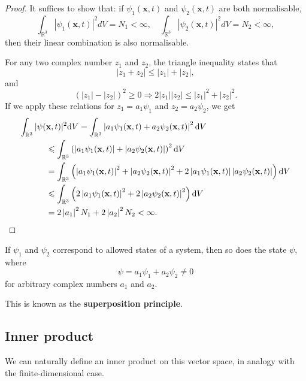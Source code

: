 \documentclass[a4paper,11pt]{article}
\begin{document}
\begin{proof}
    It suffices to show that: if $\psi_1(\mathbf{x}, t)$ and $\psi_2(\mathbf{x}, t)$ are both normalisable,
    \[
    \int_{\mathbb{R}^3}\left|\psi_1(\mathbf{x}, t)\right|^2 d V=N_1<\infty, \quad \int_{\mathbb{R}^3}\left|\psi_2(\mathbf{x}, t)\right|^2 d V=N_2<\infty,
    \]
    then their linear combination is also normalisable.

    For any two complex number $z_1$ and $z_2$, the triangle inequality states that
    \[
    \left|z_1+z_2\right| \leq\left|z_1\right|+\left|z_2\right|,
    \]
    and
    \[
    \left(\left|z_1\right|-\left|z_2\right|\right)^2 \geq 0 \Rightarrow 2\left|z_1\right|\left|z_2\right| \leq\left|z_1\right|^2+\left|z_2\right|^2 .
    \]
    If we apply these relations for $z_1=a_1 \psi_1$ and $z_2=a_2 \psi_2$, we get
    \begin{align*}
        \int_{\mathbb{R}^3}|\psi(&\mathbf{x}, t)|^2 \dd V =\int_{\mathbb{R}^3}\left|a_1 \psi_1(\mathbf{x}, t)+a_2 \psi_2(\mathbf{x}, t)\right|^2 \dd V \\
        & \leqslant \int_{\mathbb{R}^3}\left(\left|a_1 \psi_1(\mathbf{x}, t)\right|+\left|a_2 \psi_2(\mathbf{x}, t)\right|\right)^2 \dd V \\
        &=\int_{\mathbb{R}^3}\left(\left|a_1 \psi_1(\mathbf{x}, t)\right|^2+\left|a_2 \psi_2(\mathbf{x}, t)\right|^2+2\left|a_1 \psi_1(\mathbf{x}, t)\right|\left|a_2 \psi_2(\mathbf{x}, t)\right|\right) \dd V \\
        & \leqslant \int_{\mathbb{R}^3}\left(2\left|a_1 \psi_1(\mathbf{x}, t)\right|^2+2\left|a_2 \psi_2(\mathbf{x}, t)\right|^2\right) \dd V \\
        &=2\left|a_1\right|^2 N_1+2\left|a_2\right|^2 N_2<\infty .\qedhere
    \end{align*}
\end{proof}

\begin{corollary}
    If $\psi_1$ and $\psi_2$ correspond to allowed states of a system, then so does the state $\psi$, where
    \[
    \psi=a_1 \psi_1+a_2 \psi_2 \neq 0
    \]
    for arbitrary complex numbers $a_1$ and $a_2$. 
\end{corollary}
This is known as the \textbf{superposition principle}.

\subsection{Inner product}
We can naturally define an inner product on this vector space, in analogy with the finite-dimensional case.
\end{document}
